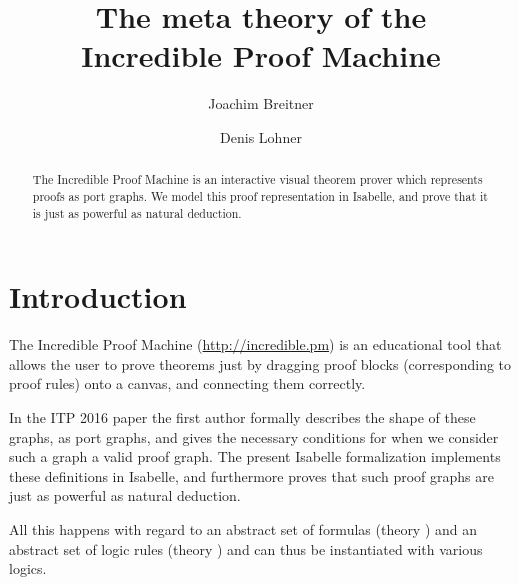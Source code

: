 \documentclass[11pt,DIV16,a4paper,parskip=half]{scrartcl}
\begin{document}
\title{The meta theory of the\\ Incredible Proof Machine}
\author{Joachim Breitner \and Denis Lohner}
\maketitle

\begin{abstract}
\noindent
The Incredible Proof Machine is an interactive visual theorem prover which represents proofs as
port graphs. We model this proof representation in Isabelle, and prove that it is just
as powerful as natural deduction.
\end{abstract}

\tableofcontents

\section{Introduction}

The Incredible Proof Machine (\url{http://incredible.pm}) is an educational tool that allows the user to
prove theorems just by dragging proof blocks (corresponding to proof rules) onto a canvas, and connecting them
correctly.

In the ITP 2016 paper \cite{incredible} the first author formally describes the
shape of these graphs, as port graphs, and gives the necessary conditions for
when we consider such a graph a valid proof graph. The present Isabelle
formalization implements these definitions in Isabelle, and furthermore proves
that such proof graphs are just as powerful as natural deduction.

All this happens with regard to an abstract set of formulas (theory
) and an abstract set of logic rules (theory
) and can thus be instantiated with various logics.
\end{document}
